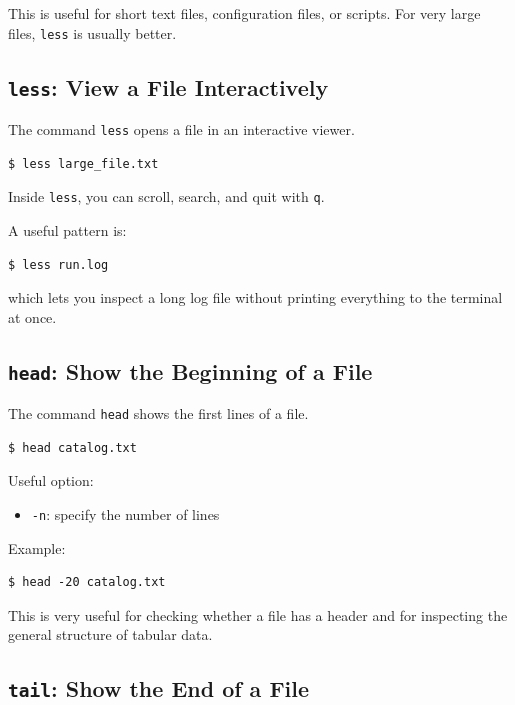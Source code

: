 This is useful for short text files, configuration files, or scripts.
For very large files, \texttt{less} is usually better.

\subsection{\texttt{less}: View a File Interactively}

The command \texttt{less} opens a file in an interactive viewer.

\begin{lstlisting}
$ less large_file.txt
\end{lstlisting}

Inside \texttt{less}, you can scroll, search, and quit with \texttt{q}.

A useful pattern is:

\begin{lstlisting}
$ less run.log
\end{lstlisting}

which lets you inspect a long log file without printing everything to
the terminal at once.

\subsection{\texttt{head}: Show the Beginning of a File}

The command \texttt{head} shows the first lines of a file.

\begin{lstlisting}
$ head catalog.txt
\end{lstlisting}

Useful option:

\begin{itemize}
\item \texttt{-n}: specify the number of lines
\end{itemize}

Example:

\begin{lstlisting}
$ head -20 catalog.txt
\end{lstlisting}

This is very useful for checking whether a file has a header and for
inspecting the general structure of tabular data.

\subsection{\texttt{tail}: Show the End of a File}

